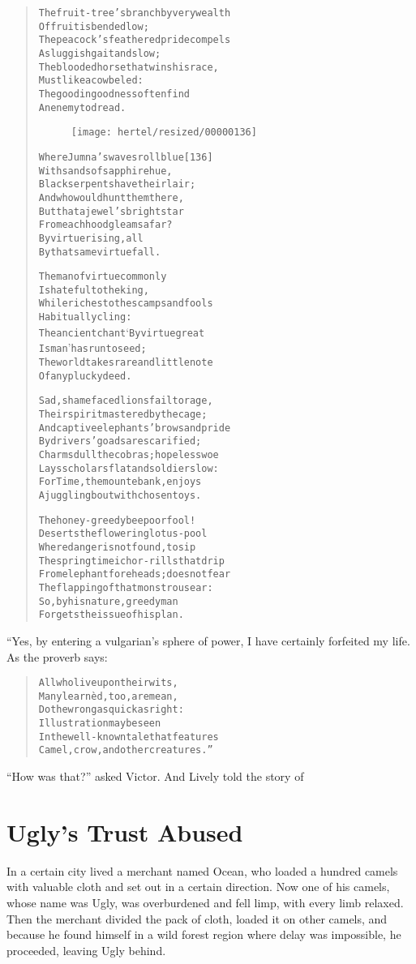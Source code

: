 \documentclass[article, twoside, 10pt]{memoir}
\renewenvironment{verbatim}{%
\begin{quote}%
\vskip -10pt%
\begin{alltt}\normalfont\small}{\end{alltt}%
\end{quote}%
\vskip -10pt
} %
\begin{document}
\begin{verbatim}
The fruit-tree's branch by very wealth
    Of fruit is bended low;
The peacock's feathered pride compels
    A sluggish gait and slow;
The blooded horse that wins his race,
    Must like a cow be led:
The good in goodness often find
    An enemy to dread.

\begin{figure}[p]\texttt{[image: hertel/resized/00000136]}\end{figure}Where Jumna's waves roll blue                           [136]
With sands of sapphire hue,
Black serpents have their lair;
And who would hunt them there,
But that a jewel's bright star
From each hood gleams afar?
By virtue rising, all
By that same virtue fall.

The man of virtue commonly
    Is hateful to the king,
While riches to the scamps and fools
    Habitually cling:
The ancient chant ‘By virtue great
    Is man’ has run to seed;
The world takes rare and little note
    Of any plucky deed.

Sad, shamefaced lions fail to rage,
Their spirit mastered by the cage;
And captive elephants' brows and pride
By drivers' goads are scarified;
Charms dull the cobras; hopeless woe
Lays scholars flat and soldiers low:
For Time, the mountebank, enjoys
A juggling bout with chosen toys.

The honey-greedy bee{\textemdash}poor fool!{\textemdash}
Deserts the flowering lotus-pool
Where danger is not found, to sip
The springtime ichor-rills that drip
From elephant foreheads; does not fear
The flapping of that monstrous ear:
So, by his nature, greedy man
Forgets the issue of his plan.
\end{verbatim}
“Yes, by entering a vulgarian's sphere of power, I have certainly
forfeited my life. As the proverb says:

\begin{verbatim}
All who live upon their wits,
    Many learnèd, too, are mean,
Do the wrong as quick as right:
    Illustration may be seen
In the well-known tale that features
Camel, crow, and other creatures.”
\end{verbatim}
``How was that?'' asked Victor. And Lively told the story of

\chapter{Ugly's Trust Abused}

In a certain city lived a merchant named Ocean, who loaded a
hundred camels with valuable cloth and set out in a certain
direction. Now one of his camels, whose name was Ugly, was
overburdened and fell limp, with every limb relaxed. Then the
merchant divided the pack of cloth, loaded it on other camels, and
because he found himself in a wild forest region where delay was
impossible, he proceeded, leaving Ugly behind.
\end{document}
